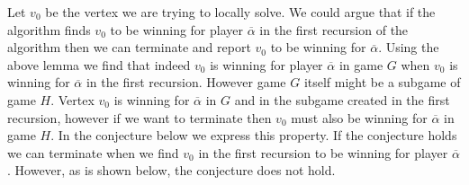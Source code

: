 Let $v_0$ be the vertex we are trying to locally solve. We could argue that if the algorithm finds $v_0$ to be winning for player $\overline{\alpha}$ in the first recursion of the algorithm then we can terminate and report $v_0$ to be winning for $\overline{\alpha}$. Using the above lemma we find that indeed $v_0$ is winning for player $\overline{\alpha}$ in game $G$ when $v_0$ is winning for $\overline{\alpha}$ in the first recursion. However game $G$ itself might be a subgame of game $H$. Vertex $v_0$ is winning for $\overline{\alpha}$ in $G$ and in the subgame created in the first recursion, however if we want to terminate then $v_0$ must also be winning for $\overline{\alpha}$ in game $H$. In the conjecture below we express this property. If the conjecture holds we can terminate when we find $v_0$ in the first recursion to be winning for player $\overline{\alpha}$. However, as is shown below, the conjecture does not hold.

